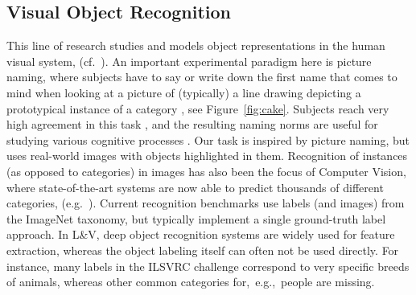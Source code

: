 \subsection{Visual Object Recognition}

This line of research studies and models object representations in the human visual system, (cf.\ ). 
An important experimental paradigm here is picture naming, where subjects have to say or write down the first name that comes to mind when looking at a picture of (typically) a line drawing depicting a prototypical instance of a category \cite{snodgrass}, see Figure\ \ref{fig:cake}.
Subjects reach very high agreement in this task \cite{rossion2004revisiting}, and the resulting naming norms are useful for studying various cognitive processes \cite{humphreys1988cascade}.
Our task is inspired by picture naming, but uses real-world images with objects highlighted in them.
Recognition of instances (as opposed to categories) in images has also been the focus of Computer Vision, where state-of-the-art systems are now able to predict thousands of different categories, (e.g.\ ). 
Current recognition benchmarks use labels (and images) from the ImageNet \cite{imagenet_cvpr09} taxonomy, but typically implement a single ground-truth label approach. 
In L\&V, deep object recognition systems are widely used for feature extraction, whereas the object labeling itself can often not be used directly. For instance, many labels in the ILSVRC  challenge \cite{ILSVRC15} correspond to very specific breeds of animals, whereas other common categories  for,\ e.g.,\ people are missing.

